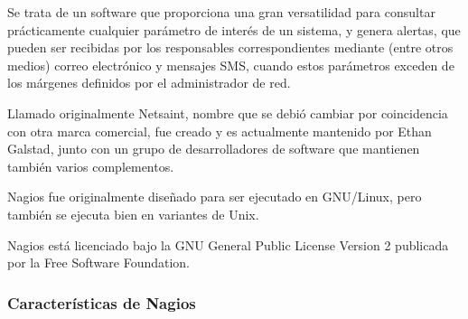 Se trata de un software que proporciona una gran versatilidad para consultar prácticamente cualquier parámetro de interés de un sistema, y genera alertas, que pueden ser recibidas por los responsables correspondientes mediante (entre otros medios) correo electrónico y mensajes SMS, cuando estos parámetros exceden de los márgenes definidos por el administrador de red.

Llamado originalmente Netsaint, nombre que se debió cambiar por coincidencia con otra marca comercial, fue creado y es actualmente mantenido por Ethan Galstad, junto con un grupo de desarrolladores de software que mantienen también varios complementos.

Nagios fue originalmente diseñado para ser ejecutado en GNU/Linux, pero también se ejecuta bien en variantes de Unix.

Nagios está licenciado bajo la GNU General Public License Version 2
publicada por la Free Software Foundation.

\subsubsection{Características de Nagios}

